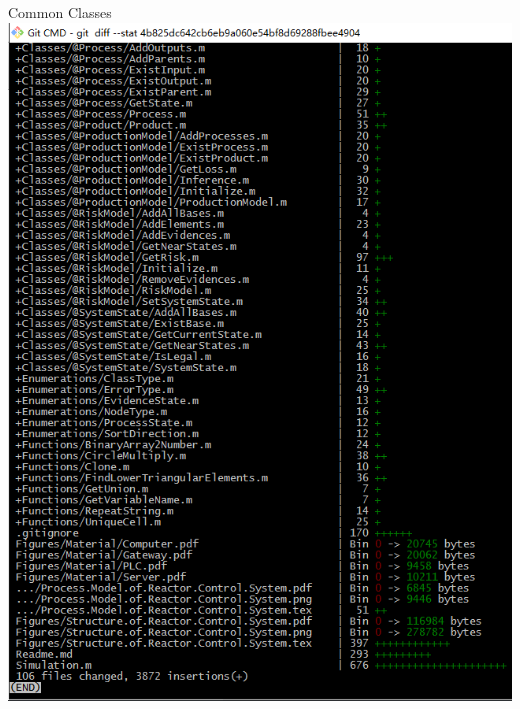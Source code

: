 \documentclass[10pt]{beamer}
\begin{document}
\begin{frame}{Common Classes}
  \centering
  \includegraphics[height = 0.9\textheight]{Figures/Line.Count.png}
\end{frame}
\end{document}
